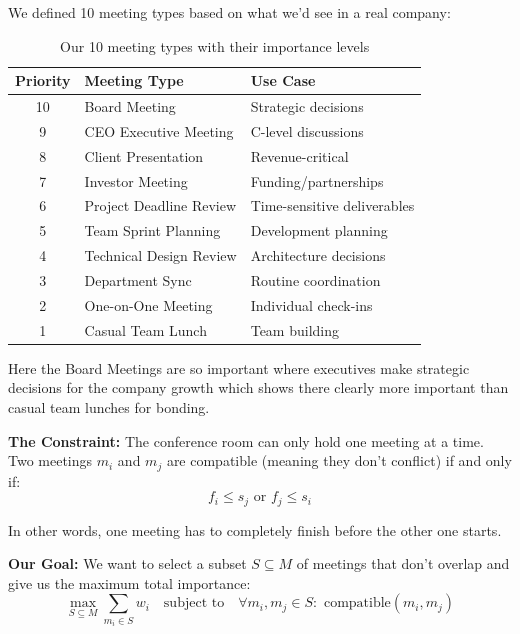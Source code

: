 \documentclass[conference]{IEEEtran}
\begin{document}
We defined 10 meeting types based on what we'd see in a real company:

\begin{table}[h!]
\centering
\footnotesize
\begin{tabular}{@{}clp{3cm}@{}}
\toprule
\textbf{Priority} & \textbf{Meeting Type} & \textbf{Use Case} \\ \midrule
10 & Board Meeting & Strategic decisions \\
9 & CEO Executive Meeting & C-level discussions \\
8 & Client Presentation & Revenue-critical \\
7 & Investor Meeting & Funding/partnerships \\
6 & Project Deadline Review & Time-sensitive deliverables \\
5 & Team Sprint Planning & Development planning \\
4 & Technical Design Review & Architecture decisions \\
3 & Department Sync & Routine coordination \\
2 & One-on-One Meeting & Individual check-ins \\
1 & Casual Team Lunch & Team building \\ \bottomrule
\end{tabular}
\caption{Our 10 meeting types with their importance levels}
\end{table}

Here the Board Meetings are so important where executives make strategic decisions for the company growth which shows there clearly more important than casual team lunches for bonding.

\textbf{The Constraint:} The conference room can only hold one meeting at a time. Two meetings $m_i$ and $m_j$ are compatible (meaning they don't conflict) if and only if:
\begin{equation}
f_i \leq s_j \text{ or } f_j \leq s_i
\end{equation}

In other words, one meeting has to completely finish before the other one starts.

\textbf{Our Goal:} We want to select a subset $S \subseteq M$ of meetings that don't overlap and give us the maximum total importance:
\begin{equation}
\max_{S \subseteq M} \sum_{m_i \in S} w_i \quad \text{subject to} \quad \forall m_i, m_j \in S: \text{ compatible}(m_i, m_j)
\end{equation}
\end{document}
